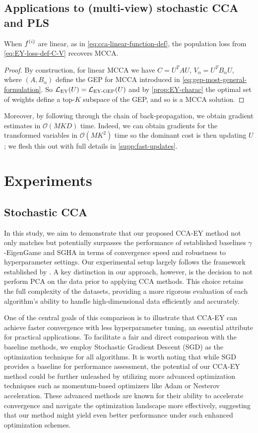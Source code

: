 \subsection{Applications to (multi-view) stochastic CCA and PLS}
\begin{lemma}
    When $f^{(i)}$ are linear, as in \ref{eq:cca-linear-function-def}, the population loss from \cref{eq:EY-loss-def-C-V} recovers MCCA.
\end{lemma}
\begin{proof}
    By construction, for linear MCCA we have $C = U^T A U,\, V_\alpha=U^T B_\alpha U$, where $(A, B_\alpha)$ define the GEP for MCCA introduced in \cref{eq:gep-most-general-formulation}.
    So $\mathcal{L}_\text{EY}(U) = \mathcal{L}_\text{EY-GEP}(U)$ and by \cref{prop:EY-charac} the optimal set of weights define a top-$K$ subspace of the GEP, and so is a MCCA solution.
\end{proof}

Moreover, by following through the chain of back-propagation, we obtain gradient estimates in $\mathcal{O}(MKD)$ time.
Indeed, we can obtain gradients for the transformed variables in $\mathcal{O}(M K^2)$ time so the dominant cost is then updating $U$; we flesh this out with full details in \cref{supp:fast-updates}.

\section{Experiments}

\subsection{Stochastic CCA}
In this study, we aim to demonstrate that our proposed CCA-EY method not only matches but potentially surpasses the performance of established baselines $\gamma$-EigenGame and SGHA in terms of convergence speed and robustness to hyperparameter settings. Our experimental setup largely follows the framework established by \citet{meng2021online, gemp2022generalized}. A key distinction in our approach, however, is the decision to not perform PCA on the data prior to applying CCA methods. This choice retains the full complexity of the datasets, providing a more rigorous evaluation of each algorithm's ability to handle high-dimensional data efficiently and accurately.

One of the central goals of this comparison is to illustrate that CCA-EY can achieve faster convergence with less hyperparameter tuning, an essential attribute for practical applications. To facilitate a fair and direct comparison with the baseline methods, we employ Stochastic Gradient Descent (SGD) as the optimization technique for all algorithms. It is worth noting that while SGD provides a baseline for performance assessment, the potential of our CCA-EY method could be further unleashed by utilizing more advanced optimization techniques such as momentum-based optimizers like Adam or Nesterov acceleration. These advanced methods are known for their ability to accelerate convergence and navigate the optimization landscape more effectively, suggesting that our method might yield even better performance under such enhanced optimization schemes.

